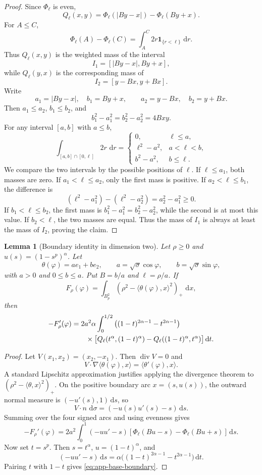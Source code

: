 \documentclass[pdflatex,sn-mathphys-num]{sn-jnl}
\numberwithin{equation}{section}
\theoremstyle{thmstyleone}
\newtheorem{lemma}[theorem]{Lemma}
\theoremstyle{thmstylethree}
\newcommand{\1}{\mathbf{1}}
\newcommand{\dd}{\,\mathrm{d}}
\begin{document}
\begin{proof}
Since $\Phi_\ell$ is even,
\[
 Q_\ell(x,y)=\Phi_\ell(|By-x|)-\Phi_\ell(By+x).
\]
For $A\le C$,
\[
 \Phi_\ell(A)-\Phi_\ell(C)=\int_A^C2r\1_{\{r<\ell\}}\,\dd r.
\]
Thus $Q_\ell(x,y)$ is the weighted mass of the interval
\[
 I_1=[|By-x|,By+x],
\]
while $Q_\ell(y,x)$ is the corresponding mass of
\[
 I_2=[y-Bx,y+Bx].
\]
Write
\[
 a_1=|By-x|,\quad b_1=By+x,\qquad
 a_2=y-Bx,\quad b_2=y+Bx.
\]
Then $a_1\le a_2$, $b_1\le b_2$, and
\[
 b_1^2-a_1^2=b_2^2-a_2^2=4Bxy.
\]
For any interval $[a,b]$ with $a\le b$,
\[
 \int_{[a,b]\cap[0,\ell]}2r\,\dd r
 =
 \begin{cases}
 0, & \ell\le a,\\
 \ell^2-a^2, & a<\ell<b,\\
 b^2-a^2, & b\le\ell.
 \end{cases}
\]
We compare the two intervals by the possible positions of $\ell$. If $\ell\le a_1$, both masses are zero. If $a_1<\ell\le a_2$, only the first mass is positive. If $a_2<\ell\le b_1$, the difference is
\[
 (\ell^2-a_1^2)-(\ell^2-a_2^2)=a_2^2-a_1^2\ge0.
\]
If $b_1<\ell\le b_2$, the first mass is $b_1^2-a_1^2=b_2^2-a_2^2$, while the second is at most this value. If $b_2<\ell$, the two masses are equal. Thus the mass of $I_1$ is always at least the mass of $I_2$, proving the claim.
\end{proof}

\begin{lemma}[Boundary identity in dimension two]\label{lem:app-base-boundary}
Let $\rho\ge0$ and $u(s)=(1-s^p)^\alpha$. Let
\[
 \theta(\varphi)=ae_1+be_2,
 \qquad
 a=\sqrt\sigma\cos\varphi,
 \qquad
 b=\sqrt\sigma\sin\varphi,
\]
with $a>0$ and $0\le b\le a$. Put $B=b/a$ and $\ell=\rho/a$. If
\[
 F_\rho(\varphi)=\int_{B_p^2}(\rho^2-\langle\theta(\varphi),x\rangle^2)_+\,\dd x,
\]
then
\begin{align}\label{eq:app-base-boundary}
 -F_\rho'(\varphi)
 &=2a^2\alpha\int_0^{1/2}
 \big((1-t)^{2\alpha-1}-t^{2\alpha-1}\big) \notag\\
 &\qquad\times
 \big[Q_\ell(t^\alpha,(1-t)^\alpha)-Q_\ell((1-t)^\alpha,t^\alpha)\big] \dd t.
\end{align}
\end{lemma}

\begin{proof}
Let $V(x_1,x_2)=(x_2,-x_1)$. Then $\operatorname{div}V=0$ and
\[
 V\cdot\nabla\langle\theta(\varphi),x\rangle=\langle\theta'(\varphi),x\rangle.
\]
A standard Lipschitz approximation justifies applying the divergence theorem to $(\rho^2-\langle\theta,x\rangle^2)_+$. On the positive boundary arc $x=(s,u(s))$, the outward normal measure is $(-u'(s),1)\dd s$, so
\[
 V\cdot n\,\dd\sigma=(-u(s)u'(s)-s)\dd s.
\]
Summing over the four signed arcs and using evenness gives
\[
 -F_\rho'(\varphi)
 =2a^2\int_0^1(-uu'-s)
 \left[\Phi_\ell(Bu-s)-\Phi_\ell(Bu+s)\right]\dd s.
\]
Now set $t=s^p$. Then $s=t^\alpha$, $u=(1-t)^\alpha$, and
\[
 (-uu'-s)\dd s
 =\alpha\big((1-t)^{2\alpha-1}-t^{2\alpha-1}\big)\dd t.
\]
Pairing $t$ with $1-t$ gives \eqref{eq:app-base-boundary}.
\end{proof}
\end{document}
